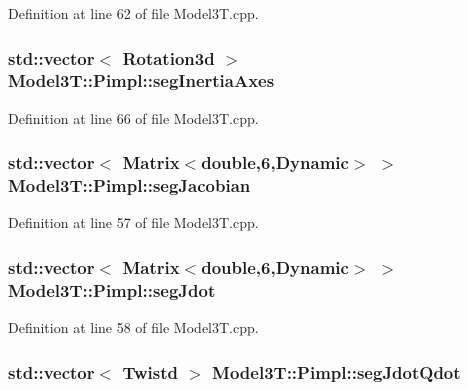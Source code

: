 Definition at line 62 of file Model3\+T.\+cpp.

\subsubsection[{\texorpdfstring{seg\+Inertia\+Axes}{segInertiaAxes}}]{\setlength{\rightskip}{0pt plus 5cm}std\+::vector$<$ Rotation3d $>$ Model3\+T\+::\+Pimpl\+::seg\+Inertia\+Axes}\hypertarget{structModel3T_1_1Pimpl_aeb0889ba54a539cba37b30d2826ad61b}{}\label{structModel3T_1_1Pimpl_aeb0889ba54a539cba37b30d2826ad61b}


Definition at line 66 of file Model3\+T.\+cpp.

\subsubsection[{\texorpdfstring{seg\+Jacobian}{segJacobian}}]{\setlength{\rightskip}{0pt plus 5cm}std\+::vector$<$ Matrix$<$double,6,Dynamic$>$ $>$ Model3\+T\+::\+Pimpl\+::seg\+Jacobian}\hypertarget{structModel3T_1_1Pimpl_ab1a67acf0553a0bf04275f5f20c2a69e}{}\label{structModel3T_1_1Pimpl_ab1a67acf0553a0bf04275f5f20c2a69e}


Definition at line 57 of file Model3\+T.\+cpp.

\subsubsection[{\texorpdfstring{seg\+Jdot}{segJdot}}]{\setlength{\rightskip}{0pt plus 5cm}std\+::vector$<$ Matrix$<$double,6,Dynamic$>$ $>$ Model3\+T\+::\+Pimpl\+::seg\+Jdot}\hypertarget{structModel3T_1_1Pimpl_af9cd027badf0a713437cd6d1a924cfb6}{}\label{structModel3T_1_1Pimpl_af9cd027badf0a713437cd6d1a924cfb6}


Definition at line 58 of file Model3\+T.\+cpp.

\subsubsection[{\texorpdfstring{seg\+Jdot\+Qdot}{segJdotQdot}}]{\setlength{\rightskip}{0pt plus 5cm}std\+::vector$<$ Twistd $>$ Model3\+T\+::\+Pimpl\+::seg\+Jdot\+Qdot}\hypertarget{structModel3T_1_1Pimpl_a504aa134750da2f42dfe8fa7e431b9cd}{}\label{structModel3T_1_1Pimpl_a504aa134750da2f42dfe8fa7e431b9cd}


